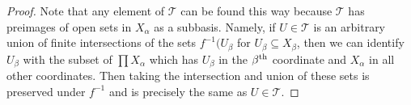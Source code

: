 \documentclass{article}
\begin{document}
\begin{proof}
Note that any element of $\mathcal{T}$ can be found this way because $\mathcal{T}$ has preimages of open sets in $X_{\alpha}$ as a subbasis. Namely, if $U \in \mathcal{T}$ is an arbitrary union of finite intersections of the sets $f^{-1}(U_{\beta}$ for $U_{\beta} \subseteq X_{\beta}$, then we can identify $U_{\beta}$ with the subset of $\prod X_{\alpha}$ which has $U_{\beta}$ in the $\beta^{\textup{th}}$ coordinate and $X_{\alpha}$ in all other coordinates. Then taking the intersection and union of these sets is preserved under $f^{-1}$ and is precisely the same as $U \in \mathcal{T}$.
\end{proof}
\end{document}
